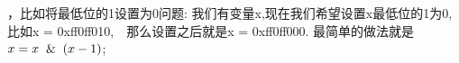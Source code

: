     
，比如将最低位的1设置为0问题: 我们有变量x,现在我们希望设置x最低位的1为0,比如x = 0xff0ff010,　那么设置之后就是x = 0xff0ff000. 最简单的做法就是$x = x \And (x - 1)$;

